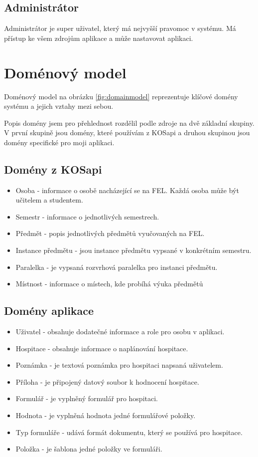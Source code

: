 \subsection{Administrátor}
Administrátor je super uživatel, který má nejvyšší pravomoc v systému. Má přístup ke všem zdrojům aplikace a může nastavovat aplikaci.

\section{Doménový model}
Doménový model na obrázku \ref{fig:domainmodel} reprezentuje klíčové domény systému a jejich vztahy mezi sebou. 

Popis domény jsem pro přehlednost rozdělil podle zdroje na dvě základní skupiny. V první skupině jsou domény, které používám z KOSapi a druhou skupinou jsou domény specifické pro moji aplikaci. 

\subsection{Domény z KOSapi}
\begin{itemize}
\item Osoba - informace o osobě nacházející se na FEL. Každá osoba může být učitelem a studentem.
\item Semestr - informace o jednotlivých semestrech. 
\item Předmět - popis jednotlivých předmětů vyučovaných na FEL.
\item Instance předmětu - jsou instance předmětu vypsané v konkrétním semestru.
\item Paralelka - je vypsaná rozvrhová paralelka pro instanci předmětu.
\item Místnost - informace o místech, kde probíhá výuka předmětů
\end{itemize}

\subsection{Domény aplikace}
\begin{itemize}
\item Uživatel - obsahuje dodatečné informace a role pro osobu v aplikaci.
\item Hospitace - obsahuje informace o naplánování hospitace. 
\item Poznámka - je textová poznámka pro hospitaci napsaná uživatelem.
\item Příloha - je připojený datový soubor k hodnocení hospitace.
\item Formulář - je vyplněný formulář pro hospitaci.
\item Hodnota - je vyplněná hodnota jedné formulářové položky.
\item Typ formuláře - udává formát dokumentu, který se používá pro hospitace. 
\item Položka - je šablona jedné položky ve formuláři.
\end{itemize}

